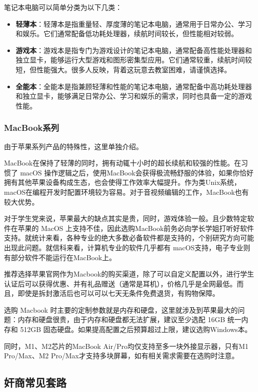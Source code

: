 \documentclass[../main.tex]{subfiles}
\begin{document}
笔记本电脑可以简单分类为以下几类：

\begin{itemize}
    \item \textbf{轻薄本}：轻薄本是指重量轻、厚度薄的笔记本电脑，通常用于日常办公、学习和娱乐。它们通常配备低功耗处理器，续航时间较长，但性能相对较弱。
    \item \textbf{游戏本}：游戏本是指专门为游戏设计的笔记本电脑，通常配备高性能处理器和独立显卡，能够运行大型游戏和图形密集型应用。它们通常较重，续航时间较短，但性能强大。很多人反映，背着这玩意去教室困难，请谨慎选择。
    \item \textbf{全能本}：全能本是指兼顾轻薄和性能的笔记本电脑，通常配备中高功耗处理器和独立显卡，能够满足日常办公、学习和娱乐的需求，同时也具备一定的游戏性能。
\end{itemize}

\subsubsection{MacBook系列}
由于苹果系列产品的特殊性，这里单独介绍。

MacBook在保持了轻薄的同时，拥有动辄十小时的超长续航和较强的性能。在习惯了 macOS 操作逻辑之后，使用MacBook会获得极流畅舒服的体验，如果你恰好拥有其他苹果设备构成生态，也会使得工作效率大幅提升。作为类Unix系统，macOS在编程开发时配置环境较为容易。对于音视频编辑的工作，MacBook也有较大优势。

对于学生党来说，苹果最大的缺点其实是贵，同时，游戏体验一般。且少数特定软件在苹果的 MacOS 上支持不佳，因此选购MacBook前务必向学长学姐打听好软件支持。就统计来看，各种专业的绝大多数必备软件都是支持的，个别研究方向可能出现此问题。就信科来看，计算机专业的软件几乎都有 macOS支持，电子专业则有部分软件不能运行在MacBook上。

推荐选择苹果官网作为Macbook的购买渠道，除了可以自定义配置以外，进行学生认证后可以获得优惠、并有礼品赠送（通常是耳机），价格几乎是全网最低。而且，即使是拆封激活后也可以可以七天无条件免费退货，有购物保障。

选购 Macbook 时主要的定制参数就是内存和硬盘，这里就涉及到苹果最大的问题：内存和硬盘很贵，由于内存和硬盘都无法扩展，建议至少选配 16GB 统一内存和 512GB 固态硬盘。如果提高配置之后预算超过上限，建议选购Windows本。

同时，M1、M2芯片的MacBook Air/Pro均仅支持至多一块外接显示器，只有M1 Pro/Max、M2 Pro/Max才支持多块屏幕，如有相关需求需要在选购时注意。

\subsection{奸商常见套路}
\end{document}
